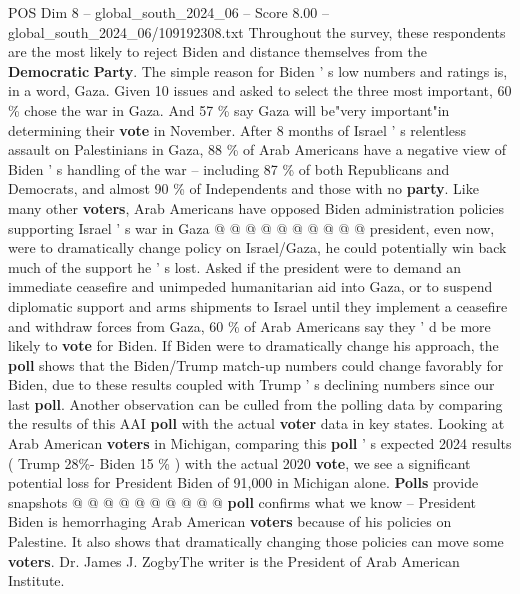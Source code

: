 \begin{textsample}{POS Dim 8 – global\_south\_2024\_06 – Score 8.00 – global\_south\_2024\_06/109192308.txt}
Throughout the survey, these respondents are the most likely to reject Biden and distance themselves from the \textbf{Democratic} \textbf{Party}.
The simple reason for Biden ' s low numbers and ratings is, in a word, Gaza.
Given 10 issues and asked to select the three most important, 60 \% chose the war in Gaza.
And 57 \% say Gaza will be"very important"in determining their \textbf{vote} in November.
After 8 months of Israel ' s relentless assault on Palestinians in Gaza, 88 \% of Arab Americans have a negative view of Biden ' s handling of the war -- including 87 \% of both Republicans and Democrats, and almost 90 \% of Independents and those with no \textbf{party}.
Like many other \textbf{voters}, Arab Americans have opposed Biden administration policies supporting Israel ' s war in Gaza @ @ @ @ @ @ @ @ @ @ president, even now, were to dramatically change policy on Israel/Gaza, he could potentially win back much of the support he ' s lost.
Asked if the president were to demand an immediate ceasefire and unimpeded humanitarian aid into Gaza, or to suspend diplomatic support and arms shipments to Israel until they implement a ceasefire and withdraw forces from Gaza, 60 \% of Arab Americans say they ' d be more likely to \textbf{vote} for Biden.
If Biden were to dramatically change his approach, the \textbf{poll} shows that the Biden/Trump match-up numbers could change favorably for Biden, due to these results coupled with Trump ' s declining numbers since our last \textbf{poll}.
Another observation can be culled from the polling data by comparing the results of this AAI \textbf{poll} with the actual \textbf{voter} data in key states.
Looking at Arab American \textbf{voters} in Michigan, comparing this \textbf{poll} ' s expected 2024 results ( Trump 28\%- Biden 15 \% ) with the actual 2020 \textbf{vote}, we see a significant potential loss for President Biden of 91,000 in Michigan alone. \textbf{Polls} provide snapshots @ @ @ @ @ @ @ @ @ @ \textbf{poll} confirms what we know -- President Biden is hemorrhaging Arab American \textbf{voters} because of his policies on Palestine.
It also shows that dramatically changing those policies can move some \textbf{voters}.
Dr.
James J.
ZogbyThe writer is the President of Arab American Institute.

\end{textsample}

